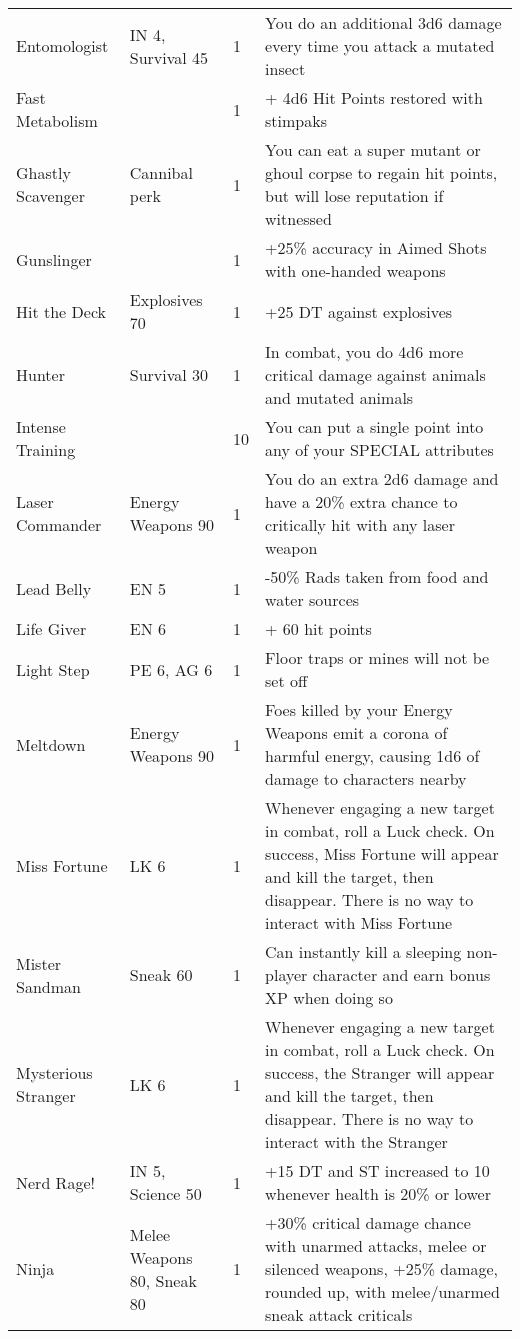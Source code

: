 \begin{longtable}{|p{3.3cm}|p{3.1cm}|p{1.2cm}|p{8.4cm}|}
Entomologist & IN 4, Survival 45 & 1 & You do an additional 3d6 damage every time you attack a mutated insect \\
Fast Metabolism & & 1 & + 4d6 Hit Points restored with stimpaks \\
Ghastly Scavenger & Cannibal perk & 1 & You can eat a super mutant or ghoul corpse to regain hit points, but will lose reputation if witnessed \\
Gunslinger & & 1 & +25\% accuracy in Aimed Shots with one-handed weapons \\
Hit the Deck & Explosives 70 & 1 & +25 DT against explosives \\
Hunter & Survival 30 & 1 & In combat, you do 4d6 more critical damage against animals and mutated animals \\
Intense Training & & 10 & You can put a single point into any of your SPECIAL attributes \\
Laser Commander & Energy Weapons 90 & 1 & You do an extra 2d6 damage and have a 20\% extra chance to critically hit with any laser weapon \\
Lead Belly & EN 5 & 1 & -50\% Rads taken from food and water sources \\
Life Giver & EN 6 & 1 & + 60 hit points \\
Light Step & PE 6, AG 6 & 1 & Floor traps or mines will not be set off \\
Meltdown & Energy Weapons 90 & 1 & Foes killed by your Energy Weapons emit a corona of harmful energy, causing 1d6 of damage to characters nearby \\
Miss Fortune & LK 6 & 1 & Whenever engaging a new target in combat, roll a Luck check. On success, Miss Fortune will appear and kill the target, then disappear. There is no way to interact with Miss Fortune \\
Mister Sandman & Sneak 60 & 1 & Can instantly kill a sleeping non-player character and earn bonus XP when doing so \\
Mysterious Stranger & LK 6 & 1 & Whenever engaging a new target in combat, roll a Luck check. On success, the Stranger will appear and kill the target, then disappear. There is no way to interact with the Stranger \\
Nerd Rage! & IN 5, Science 50 & 1 & +15 DT and ST increased to 10 whenever health is 20\% or lower \\
Ninja & Melee Weapons 80, Sneak 80 & 1 & +30\% critical damage chance with unarmed attacks, melee or silenced weapons, +25\% damage, rounded up, with melee/unarmed sneak attack criticals \\

\end{longtable}
